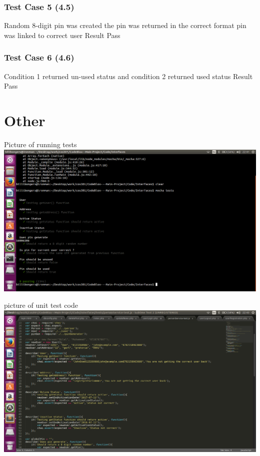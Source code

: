 \documentclass[a4paper,12pt]{article}
\begin{document}
			\subsubsection{Test Case 5 (4.5)}
			Random 8-digit pin was created
			the pin was returned in the correct format \newline
			pin was linked to correct user \newline
			Result \newline
			Pass \newline
			
			\subsubsection{Test Case 6 (4.6)}
			Condition 1 returned un-used status and condition 2 returned used status \newline
			Result \newline
			Pass \newline
	
	\section{Other}
	Picture of running tests \newline
				\includegraphics[width=1\textwidth]{./Pictures/1.png}\\[1.5cm] \newline
				
	picture of unit test code \newline
				\includegraphics[width=1\textwidth]{./Pictures/2.png}\\[1.5cm] \newline
				
\end{document}
